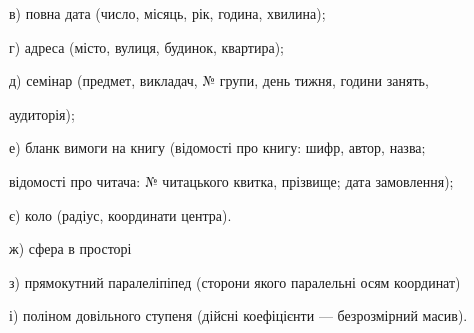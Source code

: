 \documentclass[]{article}
\begin{document}
в) повна дата (число, місяць, рік, година, хвилина);

г) адреса (місто, вулиця, будинок, квартира);

д) семінар (предмет, викладач, № групи, день тижня, години занять,

аудиторія);

е) бланк вимоги на книгу (відомості про книгу: шифр, автор, назва;

відомості про читача: № читацького квитка, прізвище; дата замовлення);

є) коло (радіус, координати центра).

ж) \protect\hypertarget{_Hlk65237605}{}{}сфера в просторі

з) прямокутний паралеліпіпед (сторони якого паралельні осям координат)

і) поліном довільного ступеня (дійсні коефіцієнти --- безрозмірний
масив).
\end{document}
